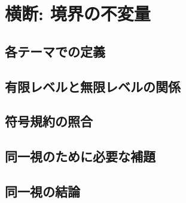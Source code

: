 
\section{横断: 境界の不変量}

\subsection{各テーマでの定義}

\subsection{有限レベルと無限レベルの関係}

\subsection{符号規約の照合}

\subsection{同一視のために必要な補題}

\subsection{同一視の結論}
